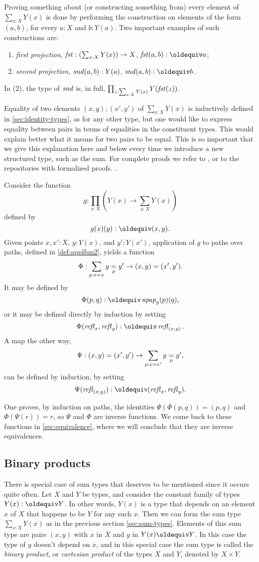 Proving something about (or constructing something from) every 
element of $\sum _{x:X} Y(x)$ is done by performing the construction on elements of the form $(a,b)$, for every $a:X$ and $b: Y(a)$.
Two important examples of such constructions are:
\begin{enumerate}
\item \emph{first projection}, 
$\fst:(\sum _{x:X} Y(x)) \to X$, 
$\fst(a,b)\defeq a$;
\item \emph{second projection},
$\snd(a,b): Y(a)$,
$\snd(a,b)\defeq b$.
\end{enumerate}
In (2), the type of $\snd$ is, in full,
$\prod_{z:\sum_{x:X} Y(x)} Y(\fst(z))$.

Equality of two elements $(x,y),(x',y')$ of $\sum _{x:X} Y(x)$ is 
inductively defined in \cref{sec:identity-types}, as for any other type, but
one would like to express equality between pairs in terms of 
equalities in the constituent types.  This would explain better
what it means for two pairs to be equal.
This is so important that we give this explanation here and below
every time we introduce a new structured type, such as the sum. 
For complete proofs we refer to \cite{hottbook}, or to the
repositories with formalized proofs. .

Consider the function $$g : \prod_{x:X} ( Y(x) \to \sum _{x:X} Y(x) ) $$ defined by $$ g(x)(y) \defeq (x,y). $$
Given points $x,x':X$, $y:Y(x)$, and $y':Y(x')$,
application of $g$ to paths over paths, defined in \cref{def:applfun2}, yields a function
$$ \Phi : \sum_{p:x=x} \pathover y Y p {y'} \to (x,y) = (x',y'). $$
It may be defined by
$$ \Phi (p,q) \defeq \apap g p q, $$
or it may be defined directly by induction by setting
$$ \Phi ( \refl x, \refl y ) \defeq \refl {(x,y)}. $$
A map the other way, 
$$ \Psi : (x,y) = (x',y') \to \sum_{p:x=x'} \pathover y Y p {y'}, $$
can be defined by induction, by setting $$\Psi (\refl {(x,y)}) \defeq (\refl x, \refl y).$$

One proves, by induction on paths, the identities $ \Psi ( \Phi (p,q) ) = (p,q) $ and $ \Phi (\Psi ( r )) = r$, so $\Psi$ and $\Phi$ are inverse functions.
We come back to these functions in \cref{sec:equivalence}, where we will conclude that they are inverse equivalences.

\subsection{Binary products}
\label{sec:binprod-types}
There is special case of sum types that deserves to be mentioned since
it occurs quite often. Let $X$ and $Y$ be types, and consider the constant
family of types $Y(x)\defeq Y$. In other words, $Y(x)$ is a type that depends
on an element $x$ of $X$ that happens to be $Y$ for any such $x$.
Then we can form the sum type $\sum_{x:X} Y(x)$ as in the previous
section \ref{sec:sum-types}. Elements of this sum type are pairs $(x,y)$
with $x$ in $X$ and $y$ in $Y(x)\jdeq Y$. In this case the type of $y$
doesn't depend on $x$, and in this special case the sum type is called
the \emph{binary product}, or \emph{cartesian product} of the types $X$ and $Y$,
denoted by $X \times Y$.

